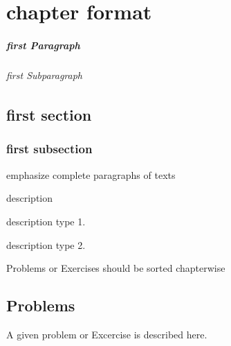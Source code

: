 %
%
%
\chapter{chapter format}
\label{intro} %


\paragraph{first Paragraph}
\subparagraph{first Subparagraph} 
\section{first section}
\label{first_section} %
\subsection{first subsection}

\begin{svgraybox}
	emphasize complete paragraphs of texts 
\end{svgraybox}

description
\begin{description}[Type 1]
	\item[Type 1]{description type 1.}
	\item[Type 2]{description type 2.}
\end{description}

Problems or Exercises should be sorted chapterwise
\section*{Problems}
%
\begin{prob}
	\label{prob1}
	A given problem or Excercise is described here. 
\end{prob}

